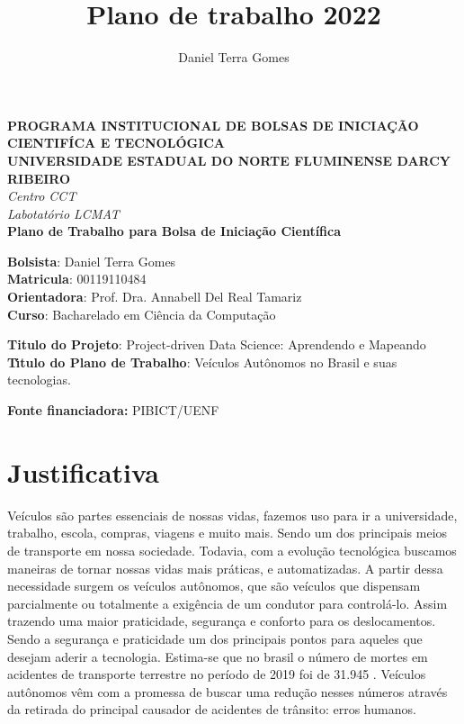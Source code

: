 \documentclass{article}
\title{Plano de trabalho 2022}
\author{Daniel Terra Gomes}
\begin{document}
\begin{titlepage}
\begin{center}
\large
\textbf{PROGRAMA INSTITUCIONAL DE BOLSAS DE INICIA\c{C}\~{A}O CIENTIF\'{I}CA E TECNOL\'{O}GICA\\\vspace{0,5cm}
UNIVERSIDADE ESTADUAL DO NORTE FLUMINENSE DARCY RIBEIRO\\
}
\textit{Centro CCT \\
Labotat\'{o}rio LCMAT\\
\vspace{1cm}}
\vspace{1,5cm}
\textbf{Plano de Trabalho para Bolsa de Iniciação Científica}\\\vspace{5cm}
\end{center}
\textbf{Bolsista}: Daniel Terra Gomes\\
\textbf{Matricula}: 00119110484\\
\textbf{Orientadora}: Prof. Dra. Annabell Del Real Tamariz  \\
\textbf{Curso}: Bacharelado em Ci\^{e}ncia da Computa\c{c}\~{a}o\\
\vspace{3cm}
\begin{center}
\textbf{Titulo do Projeto}: Project-driven Data Science: Aprendendo e Mapeando\\
\textbf{T\'{\i}tulo do Plano de Trabalho}: Veículos Autônomos no Brasil e suas tecnologias.

\textbf{Fonte financiadora:} PIBICT/UENF
\end{center}
\end{titlepage}


\section{Justificativa}

Veículos são partes essenciais de nossas vidas, fazemos uso para ir a universidade, trabalho, escola, compras, viagens e muito mais. Sendo um dos principais meios de transporte em nossa sociedade.
Todavia, com a evolução tecnológica buscamos maneiras de tornar nossas vidas mais práticas, e automatizadas. A partir dessa necessidade surgem os veículos autônomos, que são veículos que dispensam parcialmente ou totalmente a exigência de um condutor para controlá-lo. Assim trazendo uma maior praticidade, segurança e conforto para os deslocamentos. Sendo a segurança e praticidade um dos principais pontos para aqueles que desejam aderir a tecnologia.
Estima-se que no brasil o número de mortes em acidentes de transporte terrestre no período de 2019 foi de 31.945 \cite{Anexo_I_pnatrans}. Veículos autônomos vêm com a promessa de buscar uma redução nesses números através da retirada do principal causador de acidentes de trânsito: erros humanos. 
\end{document}
